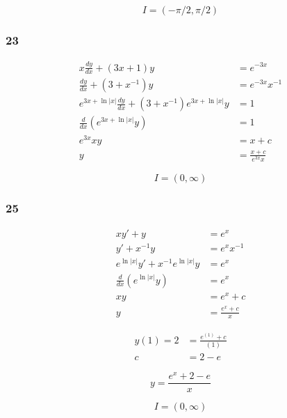 \documentclass{article}
\begin{document}
\[I = (-\pi / 2, \pi / 2)\]

\subsubsection{23}

\begin{align*}
  x \frac{d y}{d x} + (3 x + 1) y                                      & = e^{-3 x}                \\
  \frac{d y}{d x} + (3 + x^{-1}) y                                     & = e^{-3 x} x^{-1}         \\
  e^{3 x + \ln |x|} \frac{d y}{d x} + (3 + x^{-1}) e^{3 x + \ln |x|} y & = 1                       \\
  \frac{d}{dx} (e^{3x + \ln |x|} y)                                    & = 1                       \\
  e^{3 x} x y                                                          & = x + c                   \\
  y                                                                    & = \frac{x + c}{e^{3 x} x}
\end{align*}

\[I = (0, \infty)\]

\subsubsection{25}

\begin{align*}
  x y' + y                              & = e^x               \\
  y' + x^{-1} y                         & = e^x x^{-1}        \\
  e^{\ln |x|} y' + x^{-1} e^{\ln |x|} y & = e^x               \\
  \frac{d}{dx} (e^{\ln |x|} y)          & = e^x               \\
  x y                                   & = e^x + c           \\
  y                                     & = \frac{e^x + c}{x}
\end{align*}

\begin{align*}
  y(1) = 2 & = \frac{e^{(1)} + c}{(1)} \\
  c        & = 2 - e
\end{align*}

\[y = \frac{e^x + 2 - e}{x}\]

\[I = (0, \infty)\]
\end{document}

